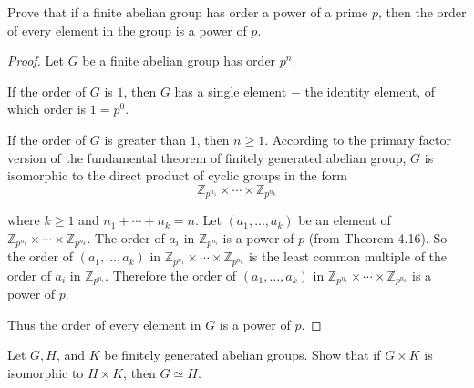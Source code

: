 \begin{exercise}
    Prove that if a finite abelian group has order a power of a prime $p$, then the order of every element in the group is a power of $p$.
\end{exercise}

\begin{proof}
    Let $G$ be a finite abelian group has order $p^{n}$.

    If the order of $G$ is $1$, then $G$ has a single element $-$ the identity element, of which order is $1 = p^{0}$.

    If the order of $G$ is greater than $1$, then $n\geq 1$. According to the primary factor version of the fundamental theorem of finitely generated abelian group, $G$ is isomorphic to the direct product of cyclic groups in the form
    \[
        \mathbb{Z}_{p^{n_{1}}} \times \cdots \times \mathbb{Z}_{p^{n_{k}}}
    \]

    where $k\geq 1$ and $n_{1} + \cdots + n_{k} = n$. Let $(a_{1}, \ldots, a_{k})$ be an element of $\mathbb{Z}_{p^{n_{1}}} \times \cdots \times \mathbb{Z}_{p^{n_{k}}}$. The order of $a_{i}$ in $\mathbb{Z}_{p^{n_{i}}}$ is a power of $p$ (from Theorem 4.16). So the order of $(a_{1}, \ldots, a_{k})$ in $\mathbb{Z}_{p^{n_{1}}} \times \cdots \times \mathbb{Z}_{p^{n_{k}}}$ is the least common multiple of the order of $a_{i}$ in $\mathbb{Z}_{p^{n_{i}}}$. Therefore the order of $(a_{1}, \ldots, a_{k})$ in $\mathbb{Z}_{p^{n_{1}}} \times \cdots \times \mathbb{Z}_{p^{n_{k}}}$ is a power of $p$.

    Thus the order of every element in $G$ is a power of $p$.
\end{proof}

\begin{exercise}
    Let $G, H$, and $K$ be finitely generated abelian groups. Show that if $G\times K$ is isomorphic to $H\times K$, then $G\simeq H$.
\end{exercise}

